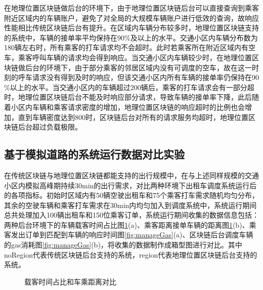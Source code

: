 ​在地理位置区块链做后台的环境下，由于地理位置区块链后台可以直接查询到乘客附近区域内的车辆账户，避免了对全局的大规模车辆账户进行低效的查询，故响应性能相比传统区块链后台有提升。在区域内车辆分布较多时，地理位置区块链支持的系统中，车辆的接单率平均保持在90$\%$及以上的水平。交通小区内车辆分布数为180辆左右时，所有乘客的打车请求均不会超时。此时若乘客所在附近区域内有空车，乘客呼叫车辆的请求均会得到响应。当交通小区内车辆较少时，在地理位置区块链做后台的环境下，由于部分乘客的邻居区域内没有可调度的空车，故在这一时刻的呼车请求没有得到及时的响应，但该交通小区内所有车辆的接单率仍保持在90$\%$以上的水平。当交通小区内的车辆超过200辆后，乘客的打车请求会有一部分超时，地理位置区块链后台不能及时响应部分请求，导致车辆的接单率下降，此后随着小区内车辆和乘客请求密度的增加，地理位置区块链的响应超时的比例也会增加，直到车辆密度达到800时，区块链后台对所有的请求服务均超时，地理位置区块链后台超过负载极限。

\subsection{基于模拟道路的系统运行数据对比实验}
在传统区块链与地理位置区块链都能支持的出行规模中，在与上述同样规模的交通小区内模拟高峰期持续30min的出行需求，对比两种环境下出租车调度系统运行后的各项指标。初始时区域内有50辆空驶出租车和75个乘客打车需求随机均匀分布，其余的空驶车辆和乘客打车需求在30min内均匀加入到调度系统中，系统运行期间总共处理加入100辆出租车和150位乘客订单，系统运行期间收集的数据信息包括：两种后台环境下的车辆载客时间占比图\ref{fig:timeDistance}(a)、乘客距离接单车辆的距离图\ref{fig:timeDistance}(b)、乘客发出订单到匹配到车辆的响应时间图\ref{fig:manageGas}(a)、区块链后台调度车辆的gas消耗图\ref{fig:manageGas}(b)，将收集的数据制作成箱型图进行对比。其中noRegion代表传统区块链后台支持的系统，region代表地理位置区块链后台支持的系统。

\begin{figure}[h]
  \centering
  \caption{载客时间占比和车乘距离对比}
  \label{fig:timeDistance}
\end{figure}

